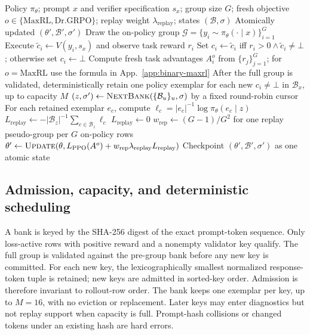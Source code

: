 \documentclass{article}
\newcommand{\1}{\mathbf 1}
\theoremstyle{remark}
\theoremstyle{definition}
\theoremstyle{plain}
\begin{document}
\begin{algorithm}[H]
  \caption{One verified-replay optimizer update: $o=\mathrm{Dr.GRPO}$
    gives Re:Dr, $o=\mathrm{MaxRL}$ gives Re:Max}
  \label{alg:verified-replay-update}
  \small
  \begin{algorithmic}[1]
    \REQUIRE Policy $\pi_\theta$; prompt $x$ and verifier specification
      $s_x$; group size $G$; fresh objective $o\in\{\mathrm{MaxRL},\mathrm{Dr.GRPO}\}$; replay weight $\lambda_{\mathrm{replay}}$;
      states $(\mathcal B,\sigma)$
    \ENSURE Atomically updated $(\theta',\mathcal B',\sigma')$
    \STATE Draw the on-policy group
      $\mathcal G=\{y_i\sim\pi_\theta(\cdot\mid x)\}_{i=1}^G$
      \STATE Execute $\widetilde c_i\gets V(y_i,s_x)$ and observe task
        reward $r_i$
      \STATE Set $c_i\gets\widetilde c_i$ iff
        $r_i>0\wedge\widetilde c_i\ne\bot$; otherwise set $c_i\gets\bot$
    \ENDFOR
    \STATE Compute fresh task advantages $A_i^{o}$ from $\{r_j\}_{j=1}^G$; for $o=\mathrm{MaxRL}$ use the formula in App.~\ref{app:binary-maxrl}
    \STATE After the full group is validated, deterministically retain one
      policy exemplar for each new $c_i\ne\bot$ in $\mathcal B_x$, up to
      capacity $M$
    \STATE $(z,\sigma')\gets\textsc{NextBank}
      (\{\mathcal B_u\}_u,\sigma)$ by a fixed round-robin cursor
      \STATE For each retained exemplar $e_c$, compute
        $\ell_c=|e_c|^{-1}\log\pi_\theta(e_c\mid z)$
      \STATE $L_{\mathrm{replay}}\gets-|\mathcal B_z|^{-1}
        \sum_{c\in\mathcal B_z}\ell_c$
    \ELSE
      \STATE $L_{\mathrm{replay}}\gets0$
    \ENDIF
    \STATE $w_{\mathrm{rep}}\gets(G-1)/G^2$ for one replay
      pseudo-group per $G$ on-policy rows
    \STATE $\theta'\gets\textsc{Update}
      (\theta,L_{\mathrm{PPO}}(A^{o})
      +w_{\mathrm{rep}}\lambda_{\mathrm{replay}}L_{\mathrm{replay}})$
    \STATE Checkpoint $(\theta',\mathcal B',\sigma')$ as one atomic state
\end{algorithmic}
\end{algorithm}

\subsection{Admission, capacity, and deterministic scheduling}
\label{app:algorithm-bank}

A bank is keyed by the SHA-256 digest of the exact prompt-token sequence.
Only loss-active rows with positive reward and a nonempty validator key
qualify. The full group is validated against the pre-group bank before
any new key is committed. For each new key, the lexicographically smallest
normalized response-token tuple is retained; new keys are admitted in
sorted-key order. Admission is therefore invariant to rollout-row order.
The bank keeps one exemplar per key, up to $M=16$, with no eviction or
replacement. Later keys may enter diagnostics but not replay support when
capacity is full. Prompt-hash collisions or changed tokens under an
existing hash are hard errors.
\end{document}
